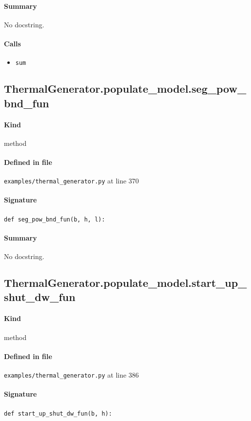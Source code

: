 \documentclass[11pt]{report}
\begin{document}
\paragraph{Summary} No docstring.
\paragraph{Calls}
\begin{itemize}[leftmargin=*]
  \item \texttt{sum}
\end{itemize}
\subsection{ThermalGenerator.populate\_model.seg\_pow\_bnd\_fun}
\label{def:examples-thermal_generator.py:ThermalGenerator.populate_model.seg_pow_bnd_fun:L370}
\paragraph{Kind} method
\paragraph{Defined in file} \texttt{examples/thermal\_generator.py} at line 370
\paragraph{Signature} \texttt{def seg\_pow\_bnd\_fun(b, h, l):}
\paragraph{Summary} No docstring.
\subsection{ThermalGenerator.populate\_model.start\_up\_shut\_dw\_fun}
\label{def:examples-thermal_generator.py:ThermalGenerator.populate_model.start_up_shut_dw_fun:L386}
\paragraph{Kind} method
\paragraph{Defined in file} \texttt{examples/thermal\_generator.py} at line 386
\paragraph{Signature} \texttt{def start\_up\_shut\_dw\_fun(b, h):}
\end{document}
